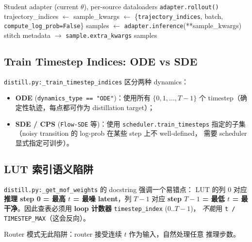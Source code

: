 \documentclass[11pt,a4paper]{article}
\theoremstyle{definition}
\begin{document}
\begin{algorithm}[H]
\caption{MoF Distill Sampling (\texttt{distill.py:sample})}
\label{alg:distill_sample}
\begin{algorithmic}[1]
\Require Student adapter (current $\theta$), per-source dataloaders
\Statex
\State \texttt{adapter.rollout()}
\State trajectory\_indices $\gets$ 
  \State sample\_kwargs $\gets$ \{\texttt{trajectory\_indices}, batch, \texttt{compute\_log\_prob=False}\}
  \State samples $\gets$ \texttt{adapter.inference}(**sample\_kwargs)
  \State stitch metadata $\to$ \texttt{sample.extra\_kwargs}
\EndFor
\State \Return samples 
\end{algorithmic}
\end{algorithm}

\subsection{Train Timestep Indices: ODE vs SDE}

\texttt{distill.py:\_train\_timestep\_indices} 区分两种 dynamics：
\begin{itemize}[leftmargin=1.5em]
\item \textbf{ODE} (\texttt{dynamics\_type == "ODE"})：使用所有
  $\{0, 1, \ldots, T{-}1\}$ 个 timestep（确定性轨迹，每点都可作为
  distillation target）；
\item \textbf{SDE / CPS} (\texttt{Flow-SDE} 等)：使用 \texttt{scheduler.train\_timesteps}
  指定的子集（noisy transition 的 log-prob 在某些 step 上不 well-defined，
  需要 scheduler 显式指定可训步）。
\end{itemize}

\subsection{LUT 索引语义陷阱}

\texttt{distill.py:\_get\_mof\_weights} 的 docstring 强调一个易错点：
LUT 的列 0 对应 \textbf{推理 step 0 = 最高 $t$ = 最噪 latent}，列 $T{-}1$
对应 \textbf{step $T{-}1$ = 最低 $t$ = 最干净}。因此查表必须用
\textbf{loop 计数器} \texttt{timestep\_index} (0..$T{-}1$)，
\emph{不能}用 \texttt{t / TIMESTEP\_MAX}（这会反向）。

Router 模式无此陷阱：router 接受连续 $t$ 作为输入，自然处理任意
推理步数。
\end{document}
